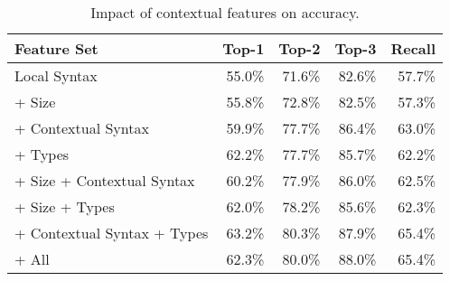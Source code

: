 \begin{table}[ht]
  \centering
  \begin{tabular}{lrrrr}
    \toprule
    Feature Set                 & Top-1  & Top-2  & Top-3  & Recall \\
    \midrule
    Local Syntax                & 55.0\% & 71.6\% & 82.6\% & 57.7\% \\
    \midrule
    + Size                      & 55.8\% & 72.8\% & 82.5\% & 57.3\% \\
    + Contextual Syntax         & 59.9\% & 77.7\% & 86.4\% & 63.0\% \\
    + Types                     & 62.2\% & 77.7\% & 85.7\% & 62.2\% \\
    \midrule
    + Size + Contextual Syntax  & 60.2\% & 77.9\% & 86.0\% & 62.5\% \\
    + Size + Types              & 62.0\% & 78.2\% & 85.6\% & 62.3\% \\
    + Contextual Syntax + Types & 63.2\% & 80.3\% & 87.9\% & 65.4\% \\
    \midrule
    + All                       & 62.3\% & 80.0\% & 88.0\% & 65.4\% \\
    \bottomrule
  \end{tabular}
  \caption{
    Impact of contextual features on accuracy.
  }\label{tab:type-error-slice}
\end{table}




